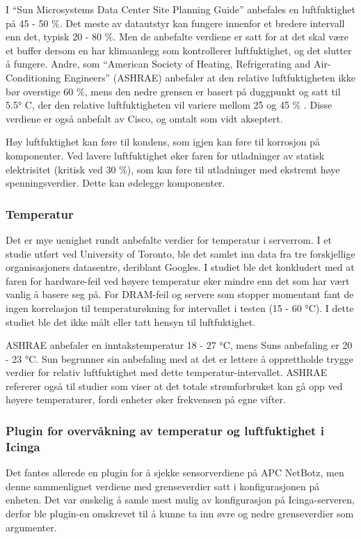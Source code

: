 I ``Sun Microsystems Data Center Site Planning Guide'' anbefales en luftfuktighet på 45 - 50 \%. Det meste av datautstyr kan fungere innenfor et bredere intervall enn det, typisk 20 - 80 \%. Men de anbefalte verdiene er satt for at det skal være et buffer dersom en har klimaanlegg som kontrollerer luftfuktighet, og det slutter å fungere\cite{planningserver}. Andre, som ``American Society of Heating, Refrigerating and Air-Conditioning Engineers'' (ASHRAE) anbefaler at den relative luftfuktigheten ikke bør overstige 60 \%, mens den nedre grensen er basert på duggpunkt og satt til 5.5° C, der den relative luftfuktigheten vil variere mellom 25 og 45 \% \cite{envguide}. Disse verdiene er også anbefalt av Cisco\cite{envguidecisco}, og omtalt som vidt akseptert. 

Høy luftfuktighet kan føre til kondens, som igjen kan føre til korrosjon på komponenter. Ved lavere luftfuktighet øker faren for utladninger av statisk elektrisitet (kritisk ved 30 \%), som kan føre til utladninger med ekstremt høye spenningsverdier. Dette kan ødelegge komponenter.

\subsubsection{Temperatur}
Det er mye uenighet rundt anbefalte verdier for temperatur i serverrom. I et studie utført ved University of Toronto\cite{torontopaper}, ble det samlet inn data fra tre forskjellige organisasjoners datasentre, deriblant Googles. I studiet ble det konkludert med at faren for hardware-feil ved høyere temperatur øker mindre enn det som har vært vanlig å basere seg på. For DRAM-feil og servere som stopper momentant fant de ingen korrelasjon til temperaturøkning for intervallet i testen (15 - 60 °C). I dette studiet ble det ikke målt eller tatt hensyn til luftfuktighet. 

ASHRAE anbefaler en inntakstemperatur 18 - 27 °C, mens Suns anbefaling er 20 - 23 °C. Sun begrunner sin anbefaling med at det er lettere å opprettholde trygge verdier for relativ luftfuktighet med dette temperatur-intervallet. ASHRAE refererer også til studier som viser at det totale strømforbruket kan gå opp ved høyere temperaturer, fordi enheter øker frekvensen på egne vifter\cite{datacentertemp}.

\subsubsection{Plugin for overvåkning av temperatur og luftfuktighet i Icinga}
Det fantes allerede en plugin for å sjekke sensorverdiene på APC NetBotz\cite{checknetbotz}, men denne sammenlignet verdiene med grenseverdier satt i konfigurasjonen på enheten. Det var ønskelig å samle mest mulig av konfigurasjon på Icinga-serveren, derfor ble plugin-en omskrevet til å kunne ta inn øvre og nedre grenseverdier som argumenter.

